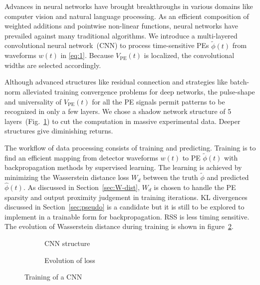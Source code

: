 Advances in neural networks have brought breakthroughs in various domains like computer vision and natural language processing. As an efficient composition of weighted additions and pointwise non-linear functions, neural networks have prevailed against many traditional algorithms. We introduce a multi-layered convolutional neural network~(CNN) to process time-sensitive PEs $\tilde{\phi}(t)$ from waveforms $w(t)$ in \eqref{eq:1}.  Because $V_\mathrm{PE}(t)$ is localized, the convolutional widths are selected accordingly.

Although advanced structures like residual connection and strategies like batch-norm alleviated training convergence problems for deep networks, the pulse-shape and universality of $V_\mathrm{PE}(t)$ for all the PE signals permit patterns to be recognized in only a few layers.  We chose a shadow network structure of 5 layers~(Fig.~\ref{fig:struct}) to cut the computation in massive experimental data.  Deeper structures give diminishing returns.

The workflow of data processing consists of training and predicting. Training is to find an efficient mapping from detector waveforms $w(t)$ to PE $\tilde{\phi}(t)$ with backpropagation methods by supervised learning.  The learning is achieved by minimizing the Wasserstein distance loss $W_d$ between the truth $\tilde{\phi}$ and predicted $\hat{\phi}(t)$.  As discussed in Section~\ref{sec:W-dist}, $W_d$ is chosen to handle the PE sparsity and output proximity judgement in training iterations.  KL divergences discussed in Section~\ref{sec:pseudo} is a candidate but it is still to be explored to implement in a trainable form for backpropagation.  RSS is less timing sensitive.  The evolution of Wasserstein distance during training is shown in figure~\ref{fig:loss}. 

\begin{figure}[H]
  \begin{subfigure}{0.35\textwidth}
    \centering
    \begin{adjustbox}{width=0.65\textwidth}
      
    \end{adjustbox}
    \caption{\label{fig:struct} CNN structure}
  \end{subfigure}
  \begin{subfigure}{0.6\textwidth}
    \centering
    \resizebox{\textwidth}{!}{}
    \caption{\label{fig:loss} Evolution of loss}
  \end{subfigure}
  \caption{\label{fig:CNN} Training of a CNN}
\end{figure}

